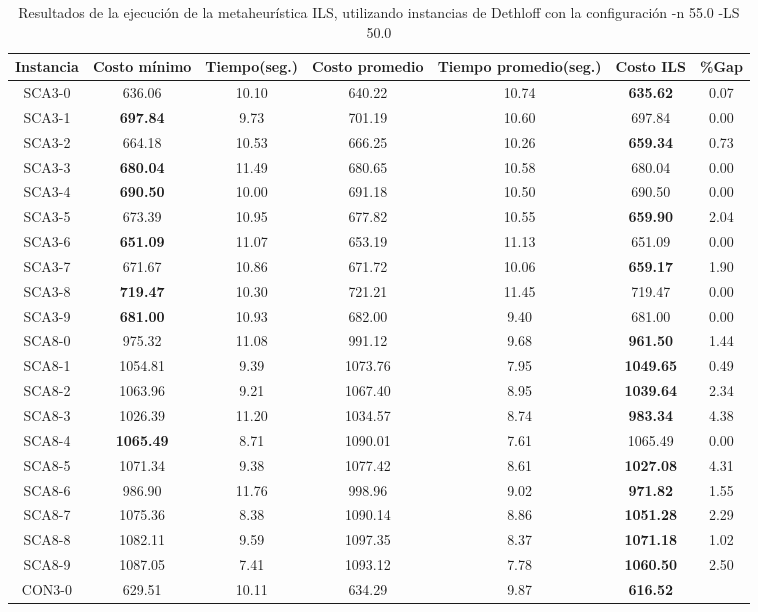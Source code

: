 \begin{table}[ht]
\caption{Resultados de la ejecución de la metaheurística ILS, utilizando instancias de Dethloff con la configuración -n 55.0 -LS 50.0}
\centering
\small
\begin{tabular}{c c c c c c c}
\hline\hline
Instancia & Costo mínimo & Tiempo(seg.) & Costo promedio & Tiempo promedio(seg.) & Costo ILS & \%Gap \\ [0.5ex]
\hline
SCA3-0 & 636.06 & 10.10 & 
640.22 & 10.74 & \bf{635.62} & 
0.07\\SCA3-1 & \bf{697.84} & 9.73 & 
701.19 & 10.60 & 697.84 & 0.00\\
SCA3-2 & 664.18 & 10.53 & 
666.25 & 10.26 & \bf{659.34} & 
0.73\\SCA3-3 & \bf{680.04} & 11.49 & 
680.65 & 10.58 & 680.04 & 0.00\\
SCA3-4 & \bf{690.50} & 10.00 & 
691.18 & 10.50 & 690.50 & 0.00\\
SCA3-5 & 673.39 & 10.95 & 
677.82 & 10.55 & \bf{659.90} & 
2.04\\SCA3-6 & \bf{651.09} & 11.07 & 
653.19 & 11.13 & 651.09 & 0.00\\
SCA3-7 & 671.67 & 10.86 & 
671.72 & 10.06 & \bf{659.17} & 
1.90\\SCA3-8 & \bf{719.47} & 10.30 & 
721.21 & 11.45 & 719.47 & 0.00\\
SCA3-9 & \bf{681.00} & 10.93 & 
682.00 & 9.40 & 681.00 & 0.00\\
SCA8-0 & 975.32 & 11.08 & 
991.12 & 9.68 & \bf{961.50} & 
1.44\\SCA8-1 & 1054.81 & 9.39 & 
1073.76 & 7.95 & \bf{1049.65} & 
0.49\\SCA8-2 & 1063.96 & 9.21 & 
1067.40 & 8.95 & \bf{1039.64} & 
2.34\\SCA8-3 & 1026.39 & 11.20 & 
1034.57 & 8.74 & \bf{983.34} & 
4.38\\SCA8-4 & \bf{1065.49} & 8.71 & 
1090.01 & 7.61 & 1065.49 & 0.00\\
SCA8-5 & 1071.34 & 9.38 & 
1077.42 & 8.61 & \bf{1027.08} & 
4.31\\SCA8-6 & 986.90 & 11.76 & 
998.96 & 9.02 & \bf{971.82} & 
1.55\\SCA8-7 & 1075.36 & 8.38 & 
1090.14 & 8.86 & \bf{1051.28} & 
2.29\\SCA8-8 & 1082.11 & 9.59 & 
1097.35 & 8.37 & \bf{1071.18} & 
1.02\\SCA8-9 & 1087.05 & 7.41 & 
1093.12 & 7.78 & \bf{1060.50} & 
2.50\\CON3-0 & 629.51 & 10.11 & 
634.29 & 9.87 & \bf{616.52} & 

\end{tabular}
\end{table}
